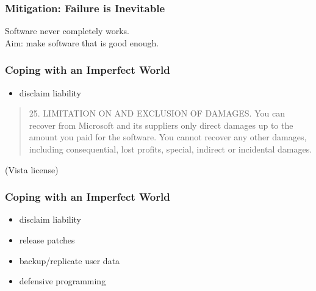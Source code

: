 \documentclass{beamer}
\newenvironment{changemargin}[1]{%
  \begin{list}{}{%
    \setlength{\topsep}{0pt}%
    \setlength{\leftmargin}{#1}%
    \setlength{\rightmargin}{1em}
    \setlength{\listparindent}{\parindent}%
    \setlength{\itemindent}{\parindent}%
    \setlength{\parsep}{\parskip}%
  }%
  \item[]}{\end{list}}
\begin{document}
\begin{frame}
  \frametitle{Mitigation: Failure is Inevitable}

  \Large
  \begin{changemargin}{2em}
  Software never completely works.\\[1em]

  Aim: make software that is good enough.
  \end{changemargin}

\end{frame}

\begin{frame}
  \frametitle{Coping with an Imperfect World}

    \begin{changemargin}{2em}
{\Large
  \begin{itemize}
   \item disclaim liability
  \end{itemize}
}
\begin{quote}
25. LIMITATION ON AND EXCLUSION OF DAMAGES. You can recover from
Microsoft and its suppliers only direct damages up to the amount you
paid for the software. You cannot recover any other damages, including
consequential, lost profits, special, indirect or incidental damages.
\end{quote}
\hfill (Vista license)
    \end{changemargin}
    
\end{frame}

\begin{frame}
  \frametitle{Coping with an Imperfect World}

  \Large
  \begin{changemargin}{2em}
  
  \begin{itemize}
   \item disclaim liability
   \item release patches
   \item backup/replicate user data
   \item defensive programming
  \end{itemize}
  \end{changemargin}
\end{frame}
\end{document}
